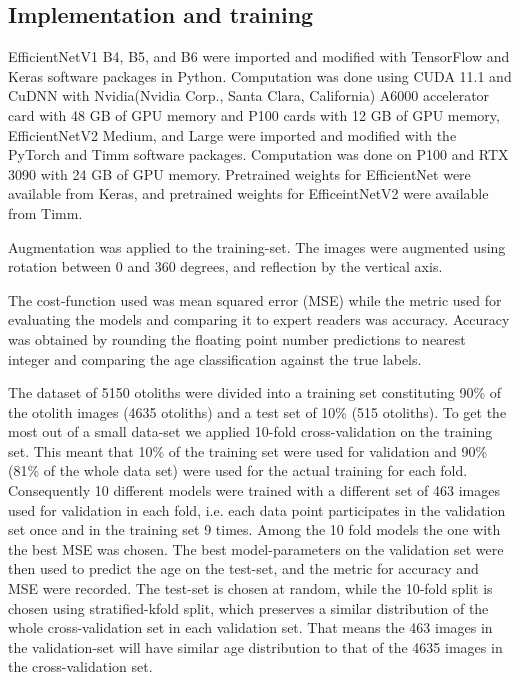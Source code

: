 \documentclass[10pt,letterpaper]{article}
\begin{document}
\subsection*{Implementation and training}

EfficientNetV1 B4, B5, and B6 were imported and modified with TensorFlow \citep{abadi2016tensorflow} and Keras \citep{keras} software packages in Python. Computation was done using CUDA 11.1 and CuDNN with Nvidia(Nvidia Corp., Santa Clara, California) A6000 accelerator card with 48 GB of GPU memory and P100 cards with 12 GB of GPU memory,
EfficientNetV2 Medium, and Large were imported and modified with the PyTorch \citep{NEURIPS2019_9015}  and Timm \citep{rw2019timm} software packages. Computation was done on P100 and RTX 3090 with 24 GB of GPU memory. Pretrained weights for EfficientNet were available from Keras, and pretrained weights for EfficeintNetV2 were available from Timm.

Augmentation was applied to the training-set. The images were augmented using rotation between 0 and 360 degrees, and reflection by the vertical axis. 

The cost-function used was mean squared error (MSE)
while the metric used for evaluating the models and comparing it to expert readers was accuracy. Accuracy was obtained by rounding the floating point number predictions to nearest integer and comparing the age classification against the true labels.

The dataset of 5150 otoliths were divided into a training set constituting 90\% of the otolith images (4635 otoliths) and a test set of 10\% (515 otoliths).
To get the most out of a small data-set we applied 10-fold cross-validation on the training set. This meant that 10\% of the training set were used for validation and 90\% (81\% of the whole data set) were used for the actual training for each fold. Consequently 10 different models were trained with a different set of 463 images used for validation in each fold, i.e. each data point participates in the validation set once and in the training set 9 times. Among the 10 fold models the one with the best MSE was chosen. The best model-parameters on the validation set were then used to predict the age on the test-set, and the metric for accuracy and MSE were recorded. The test-set is chosen at random, while the 10-fold split is chosen using stratified-kfold split, which preserves a similar distribution of the whole cross-validation set in each validation set. That means the 463 images in the validation-set will have similar age distribution to that of the 4635 images in the cross-validation set. 
\end{document}
